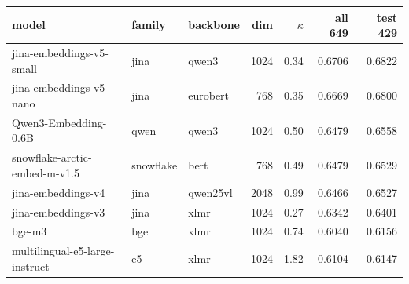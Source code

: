 \begin{tabular}{lllrrrr}
\toprule
model & family & backbone & dim & $\kappa$ & all 649 & test 429 \\
\midrule
jina-embeddings-v5-small & jina & qwen3 & 1024 & 0.34 & 0.6706 & 0.6822 \\
jina-embeddings-v5-nano & jina & eurobert & 768 & 0.35 & 0.6669 & 0.6800 \\
Qwen3-Embedding-0.6B & qwen & qwen3 & 1024 & 0.50 & 0.6479 & 0.6558 \\
snowflake-arctic-embed-m-v1.5 & snowflake & bert & 768 & 0.49 & 0.6479 & 0.6529 \\
jina-embeddings-v4 & jina & qwen25vl & 2048 & 0.99 & 0.6466 & 0.6527 \\
jina-embeddings-v3 & jina & xlmr & 1024 & 0.27 & 0.6342 & 0.6401 \\
bge-m3 & bge & xlmr & 1024 & 0.74 & 0.6040 & 0.6156 \\
multilingual-e5-large-instruct & e5 & xlmr & 1024 & 1.82 & 0.6104 & 0.6147 \\
\bottomrule
\end{tabular}